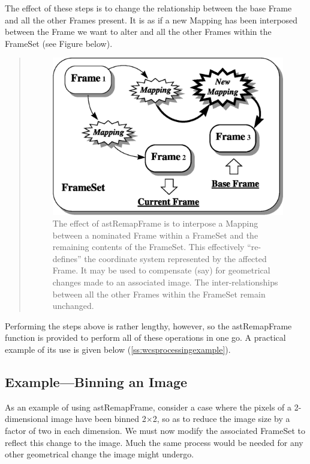 \documentclass[twoside,11pt]{article}
\newcommand{\htmlref}[2]{#1}
\newcommand{\secref}[1]{\S\ref{#1}}
\renewcommand{\secref}[1]{\ref{#1}}
\begin{document}
\begin{htmlonly}
   The effect of these steps is to change the relationship between the
   base Frame and all the other Frames present. It is as if a new Mapping
   has been interposed between the Frame we want to alter and all the
   other Frames within the FrameSet (see Figure below).
   \begin{quote}
   \begin{figure}[hbtp]
   \label{fig:fsremap}
   \includegraphics[scale=0.9]{sun211_figures/fsremap.eps}
   \caption{The effect of astRemapFrame is to interpose a Mapping between
   a nominated Frame within a FrameSet and the remaining contents of the
   FrameSet. This effectively ``re-defines'' the coordinate system
   represented by the affected Frame. It may be used to compensate (say)
   for geometrical changes made to an associated image. The
   inter-relationships between all the other Frames within the FrameSet
   remain unchanged.}
   \end{figure}
   \end{quote}
\end{htmlonly}

Performing the steps above is rather lengthy, however, so the
astRemapFrame function is provided to perform all of these operations
in one go. A practical example of its use is given below
(\secref{ss:wcsprocessingexample}).

\subsection{\label{ss:wcsprocessingexample}Example---Binning an Image}

As an example of using \htmlref{astRemapFrame}{astRemapFrame}, consider a case where the pixels
of a 2-dimensional image have been binned 2$\times$2, so as to reduce
the image size by a factor of two in each dimension.  We must now
modify the associated \htmlref{FrameSet}{FrameSet} to reflect this change to the
image. Much the same process would be needed for any other geometrical
change the image might undergo.
\end{document}
